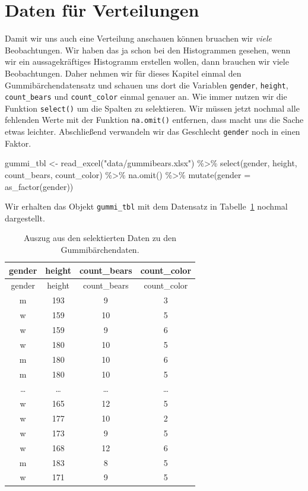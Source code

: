 \documentclass[
  letterpaper,
]{scrbook}
\newenvironment{Shaded}{\begin{snugshade}}{\end{snugshade}}
\newcommand{\AttributeTok}[1]{\textcolor[rgb]{0.40,0.45,0.13}{#1}}
\newcommand{\FunctionTok}[1]{\textcolor[rgb]{0.28,0.35,0.67}{#1}}
\newcommand{\NormalTok}[1]{\textcolor[rgb]{0.00,0.23,0.31}{#1}}
\newcommand{\OtherTok}[1]{\textcolor[rgb]{0.00,0.23,0.31}{#1}}
\newcommand{\SpecialCharTok}[1]{\textcolor[rgb]{0.37,0.37,0.37}{#1}}
\newcommand{\StringTok}[1]{\textcolor[rgb]{0.13,0.47,0.30}{#1}}
\begin{document}
\hypertarget{daten-fuxfcr-verteilungen}{%
\section{Daten für Verteilungen}\label{daten-fuxfcr-verteilungen}}

Damit wir uns auch eine Verteilung anschauen können bruachen wir
\emph{viele} Beobachtungen. Wir haben das ja schon bei den Histogrammen
gesehen, wenn wir ein aussagekräftiges Histogramm erstellen wollen, dann
brauchen wir viele Beobachtungen. Daher nehmen wir für dieses Kapitel
einmal den Gummibärchendatensatz und schauen uns dort die Variablen
\texttt{gender}, \texttt{height}, \texttt{count\_bears} und
\texttt{count\_color} einmal genauer an. Wie immer nutzen wir die
Funktion \texttt{select()} um die Spalten zu selektieren. Wir müssen
jetzt nochmal alle fehlenden Werte mit der Funktion \texttt{na.omit()}
entfernen, dass macht uns die Sache etwas leichter. Abschließend
verwandeln wir das Geschlecht \texttt{gender} noch in einen Faktor.

\begin{Shaded}
\begin{Highlighting}[]
\NormalTok{gummi\_tbl }\OtherTok{\textless{}{-}} \FunctionTok{read\_excel}\NormalTok{(}\StringTok{"data/gummibears.xlsx"}\NormalTok{)  }\SpecialCharTok{\%\textgreater{}\%}
  \FunctionTok{select}\NormalTok{(gender, height, count\_bears, count\_color) }\SpecialCharTok{\%\textgreater{}\%} 
  \FunctionTok{na.omit}\NormalTok{() }\SpecialCharTok{\%\textgreater{}\%} 
  \FunctionTok{mutate}\NormalTok{(}\AttributeTok{gender =} \FunctionTok{as\_factor}\NormalTok{(gender))}
\end{Highlighting}
\end{Shaded}

Wir erhalten das Objekt \texttt{gummi\_tbl} mit dem Datensatz in
Tabelle~\ref{tbl-data-dist-gummi} nochmal dargestellt.

\hypertarget{tbl-data-dist-gummi}{}
\begin{longtable}[]{@{}cccc@{}}
\caption{\label{tbl-data-dist-gummi}Auszug aus den selektierten Daten zu
den Gummibärchendaten.}\tabularnewline
\toprule()
gender & height & count\_bears & count\_color \\
\midrule()
\endfirsthead
\toprule()
gender & height & count\_bears & count\_color \\
\midrule()
\endhead
m & 193 & 9 & 3 \\
w & 159 & 10 & 5 \\
w & 159 & 9 & 6 \\
w & 180 & 10 & 5 \\
m & 180 & 10 & 6 \\
m & 180 & 10 & 5 \\
\ldots{} & \ldots{} & \ldots{} & \ldots{} \\
w & 165 & 12 & 5 \\
w & 177 & 10 & 2 \\
w & 173 & 9 & 5 \\
w & 168 & 12 & 6 \\
m & 183 & 8 & 5 \\
w & 171 & 9 & 5 \\
\bottomrule()
\end{longtable}
\end{document}
